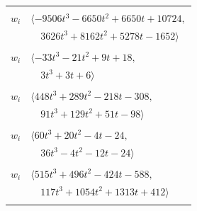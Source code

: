 \documentclass[11pt]{article}
\begin{document}
\begin{longtable}{@{}ll@{}}
\addlinespace[2pt]
\multicolumn{2}{@{}p{0.97\textwidth}@{}}{$i=19$, $D_i=160$, $\rho_{ij}$: $12{:}2, \allowbreak 14{:}1, \allowbreak 16{:}1, \allowbreak 28{:}1, \allowbreak 30{:}2, \allowbreak 33{:}1, \allowbreak 36{:}2, \allowbreak 46{:}1, \allowbreak 48{:}1, \allowbreak 51{:}2, \allowbreak 52{:}1, \allowbreak 53{:}1, \allowbreak 62{:}1, \allowbreak 63{:}2$}\\
$w_i$ & $\langle -9506t^{3}-6650t^{2}+6650t+10724,$\\
 & $\quad 3626t^{3}+8162t^{2}+5278t-1652\rangle$\\
\addlinespace[2pt]
\multicolumn{2}{@{}p{0.97\textwidth}@{}}{$i=20$, $D_i=4$, $\rho_{ij}$: $1{:}1, \allowbreak 9{:}1, \allowbreak 15{:}1, \allowbreak 16{:}1, \allowbreak 53{:}1, \allowbreak 54{:}1, \allowbreak 57{:}1, \allowbreak 58{:}2, \allowbreak 59{:}2$}\\
$w_i$ & $\langle -33t^{3}-21t^{2}+9t+18,$\\
 & $\quad 3t^{3}+3t+6\rangle$\\
\addlinespace[2pt]
\multicolumn{2}{@{}p{0.97\textwidth}@{}}{$i=21$, $D_i=16$, $\rho_{ij}$: $3{:}2, \allowbreak 6{:}2, \allowbreak 10{:}2, \allowbreak 14{:}1, \allowbreak 15{:}2, \allowbreak 26{:}2, \allowbreak 37{:}1, \allowbreak 49{:}2, \allowbreak 51{:}2, \allowbreak 54{:}1, \allowbreak 58{:}1, \allowbreak 63{:}1$}\\
$w_i$ & $\langle 448t^{3}+289t^{2}-218t-308,$\\
 & $\quad 91t^{3}+129t^{2}+51t-98\rangle$\\
\addlinespace[2pt]
\multicolumn{2}{@{}p{0.97\textwidth}@{}}{$i=22$, $D_i=2$, $\rho_{ij}$: $8{:}1, \allowbreak 12{:}1, \allowbreak 13{:}2, \allowbreak 23{:}2, \allowbreak 28{:}2, \allowbreak 48{:}2, \allowbreak 54{:}1, \allowbreak 56{:}2$}\\
$w_i$ & $\langle 60t^{3}+20t^{2}-4t-24,$\\
 & $\quad 36t^{3}-4t^{2}-12t-24\rangle$\\
\addlinespace[2pt]
\multicolumn{2}{@{}p{0.97\textwidth}@{}}{$i=23$, $D_i=16$, $\rho_{ij}$: $10{:}2, \allowbreak 14{:}1, \allowbreak 22{:}1, \allowbreak 30{:}2, \allowbreak 39{:}2, \allowbreak 41{:}1, \allowbreak 44{:}2, \allowbreak 47{:}1, \allowbreak 53{:}1, \allowbreak 54{:}2, \allowbreak 56{:}2, \allowbreak 59{:}2$}\\
$w_i$ & $\langle 515t^{3}+496t^{2}-424t-588,$\\
 & $\quad 117t^{3}+1054t^{2}+1313t+412\rangle$\\
\addlinespace[2pt]
\multicolumn{2}{@{}p{0.97\textwidth}@{}}{$i=24$, $D_i=4$, $\rho_{ij}$: $7{:}2, \allowbreak 9{:}2, \allowbreak 11{:}1, \allowbreak 14{:}2, \allowbreak 31{:}2, \allowbreak 32{:}1, \allowbreak 36{:}1, \allowbreak 48{:}1, \allowbreak 49{:}2, \allowbreak 51{:}2, \allowbreak 55{:}1$}\\

\end{longtable}
\end{document}
